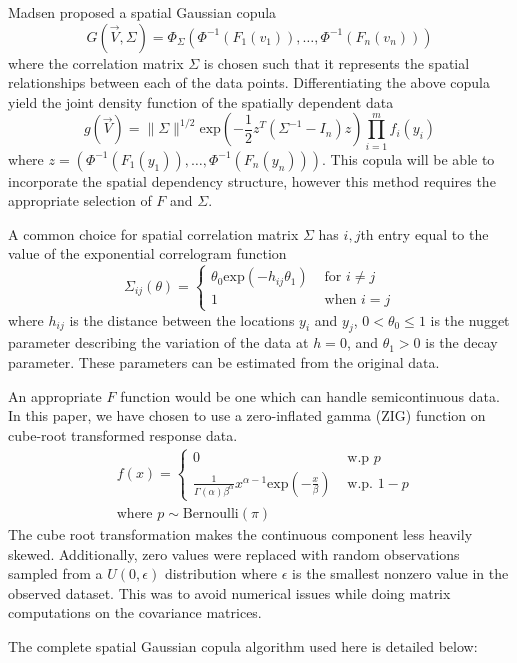 \documentclass{article}
\begin{document}
Madsen\cite{madsen09} proposed a spatial Gaussian copula
$$
G(\vec{V}, \Sigma) = \Phi_{\Sigma}(\Phi^{-1}(F_1(v_1)), \ldots, \Phi^{-1}(F_n(v_n)))
$$
where the correlation matrix $\Sigma$ is chosen such that it represents the spatial relationships between each of the data points.
Differentiating the above copula yield the joint density function of the spatially dependent data
$$
g(\vec{V}) = \| \Sigma \|^{1/2} \text{exp}\left(-\frac{1}{2} z^T (\Sigma^{-1} - I_n) z\right) \prod_{i = 1}^m f_i(y_i)
$$
where $z = (\Phi^{-1}(F_1(y_1)), \ldots, \Phi^{-1}(F_n(y_n)))$.
This copula will be able to incorporate the spatial dependency structure, however this method requires the appropriate selection of $F$ and $\Sigma$.

A common choice for spatial correlation matrix $\Sigma$ has $i,j$th entry equal to the value of the exponential correlogram function
$$
\Sigma_{ij}(\theta) = 
	\begin{cases}
		\theta_0 \text{exp}(-h_{ij} \theta_1) & \text{ for } i \neq j\\
		1 & \text{ when } i = j
	\end{cases}
$$
where $h_{ij}$ is the distance between the locations $y_i$ and $y_j$, $0 < \theta_0 \leq 1$ is the nugget parameter describing the variation of the data at $h = 0$, and $\theta_1 > 0$ is the decay parameter.
These parameters can be estimated from the original data\cite{madsen09}.

An appropriate $F$ function would be one which can handle semicontinuous data.
In this paper, we have chosen to use a zero-inflated gamma (ZIG) function on cube-root transformed response data.
\begin{align*}
&f(x) = 
\begin{cases}
	0 & \text{ w.p } p \\
	\frac{1}{\Gamma(\alpha) \beta^\alpha} x^{\alpha -1} \text{exp}\left(-\frac{x}{\beta}\right) & \text{ w.p. } 1 - p 
\end{cases} 
\\
&\text{where } p \sim \text{Bernoulli}(\pi)
\end{align*}
The cube root transformation makes the continuous component less heavily skewed.
Additionally, zero values were replaced with random observations sampled from a $U(0, \epsilon)$ distribution where $\epsilon$ is the smallest nonzero value in the observed dataset.
This was to avoid numerical issues while doing matrix computations on the covariance matrices.

The complete spatial Gaussian copula algorithm used here is detailed below:
\end{document}
